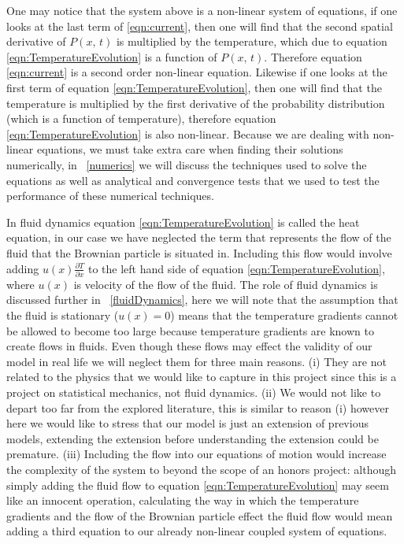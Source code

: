 One may notice that the system above is a non-linear system of equations, if one looks at the last term of \ref{eqn:current}, then one will find that the second spatial derivative of $P(x, \, t)$ is multiplied by the temperature, which due to equation \ref{eqn:TemperatureEvolution} is a function of $P(x, \, t)$. Therefore equation \ref{eqn:current} is a second order non-linear equation. Likewise if one looks at the first term of equation \ref{eqn:TemperatureEvolution}, then one will find that the temperature is multiplied by the first derivative of the probability distribution (which is a function of temperature), therefore equation \ref{eqn:TemperatureEvolution} is also non-linear. Because we are dealing with non-linear equations, we must take extra care when finding their solutions numerically, in ~\autoref{numerics} we will discuss the techniques used to solve the equations as well as analytical and convergence tests that we used to test the performance of these numerical techniques.

In fluid dynamics equation \ref{eqn:TemperatureEvolution} is called the heat equation, in our case we have neglected the term that represents the flow of the fluid that the Brownian particle is situated in. Including this flow would involve adding $u(x) \frac{\partial T}{\partial x}$ to the left hand side of equation \ref{eqn:TemperatureEvolution}, where $u(x)$ is velocity of the flow of the fluid. The role of fluid dynamics is discussed further in ~\autoref{fluidDynamics}, here we will note that the assumption that the fluid is stationary ($u(x) = 0$) means that the temperature gradients cannot be allowed to become too large because temperature gradients are known to create flows in fluids. Even though these flows may effect the validity of our model in real life we will neglect them for three main reasons. (i) They are not related to the physics that we would like to capture in this project since this is a project on statistical mechanics, not fluid dynamics. (ii) We would not like to depart too far from the explored literature, this is similar to reason (i) however here we would like to stress that our model is just an extension of previous models, extending the extension before understanding the extension could be premature. (iii) Including the flow into our equations of motion would increase the complexity of the system to beyond the scope of an honors project: although simply adding the fluid flow to equation \ref{eqn:TemperatureEvolution} may seem like an innocent operation, calculating the way in which the temperature gradients and the flow of the Brownian particle effect the fluid flow would mean adding a third equation to our already non-linear coupled system of equations.

